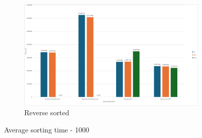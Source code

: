 \documentclass{article}
\begin{document}
\begin{figure}[!h]
\begin{subfigure}{0.45\textwidth}
            \includegraphics[width=1\linewidth]{avg1000rev.png}
            \caption{Reverse sorted}
            \label{fig:avg1000rev}
        \end{subfigure}
        \caption{Average sorting time - 1000}
        \label{fig:avg1000}
    \end{figure}
    
\end{document}
